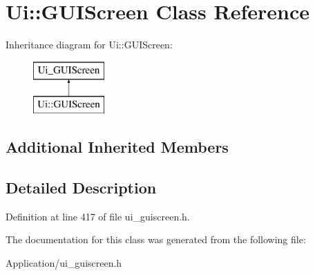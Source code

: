 \hypertarget{class_ui_1_1_g_u_i_screen}{}\section{Ui\+:\+:G\+U\+I\+Screen Class Reference}
\label{class_ui_1_1_g_u_i_screen}
Inheritance diagram for Ui\+:\+:G\+U\+I\+Screen\+:\begin{figure}[H]
\begin{center}
\leavevmode
\includegraphics[height=2.000000cm]{class_ui_1_1_g_u_i_screen}
\end{center}
\end{figure}
\subsection*{Additional Inherited Members}


\subsection{Detailed Description}


Definition at line 417 of file ui\+\_\+guiscreen.\+h.



The documentation for this class was generated from the following file\+:\begin{DoxyCompactItemize}
\item 
Application/ui\+\_\+guiscreen.\+h\end{DoxyCompactItemize}
